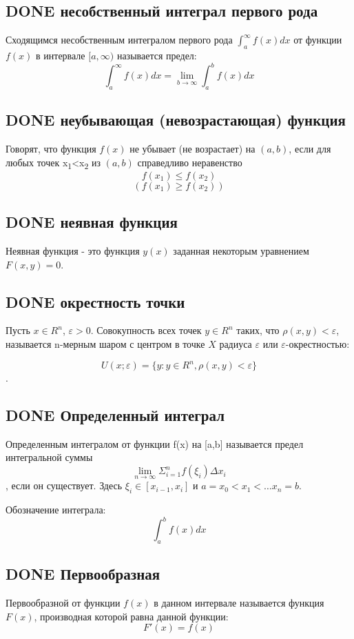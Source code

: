 \documentclass[11pt]{article}
\begin{document}
\subsection{{\bfseries\sffamily DONE} несобственный интеграл первого рода}
\label{sec:orgc1f89a0}
Сходящимся несобственным интегралом первого рода \(\int_{a}^{\infty}f(x)dx\) от функции \(f(x)\) в интервале \([a,\infty)\) называется предел:
$$\int_{a}^{\infty}f(x)dx=\lim\limits_{b→\infty}\int_{a}^{b}f(x)dx$$
\subsection{{\bfseries\sffamily DONE} неубывающая (невозрастающая) функция}
\label{sec:org60cee64}
Говорят, что функция \(f(x)\) не убывает (не возрастает) на \((a,b)\), если для любых точек x\textsubscript{1}<x\textsubscript{2} из \((a,b)\) справедливо неравенство
$$f(x_1)\leq f(x_2)$$
$$(f(x_1)\geq f(x_2))$$
\subsection{{\bfseries\sffamily DONE} неявная функция}
\label{sec:orge8b3ccc}
Неявная функция - это функция \(y(x)\) заданная некоторым уравнением \(F(x,y)=0\).
\subsection{{\bfseries\sffamily DONE} окрестность точки}
\label{sec:org8fbaf92}
Пусть \(x\in R^n\), \(\varepsilon >0\). Совокупность всех точек \(y\in R^n\) таких, что \(\rho(x,y)<\varepsilon\), называется n-мерным шаром с центром в точке \(X\) радиуса \(\varepsilon\) или \(\varepsilon\)-окрестностью:

$$U(x;\varepsilon)=\{y: y\in R^n,\rho(x,y)<\varepsilon\}$$.
\subsection{{\bfseries\sffamily DONE} Определенный интеграл}
\label{sec:orgaac1bf1}
Определенным интегралом от функции f(x) на [a,b] называется предел интегральной суммы
$$\lim\limits_{n\to\infty}\Sigma_{i=1}^{n}f(\xi_i)\Delta x_i$$,
если он существует. Здесь \(\xi_i\in[x_{i−1},x_i]\) и \(a=x_0<x_1<…x_n=b\).

Обозначение интеграла:
 $$\int_{a}^{b}f(x)dx$$
\subsection{{\bfseries\sffamily DONE} Первообразная}
\label{sec:org049ca20}
Первообразной от функции \(f(x)\) в данном интервале называется функция \(F(x)\), производная которой равна данной функции:
$$F'(x)=f(x)$$
\end{document}
